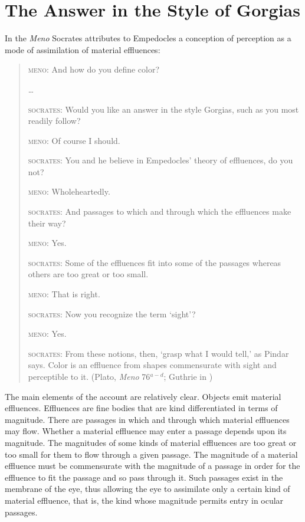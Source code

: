 
\section{The Answer in the Style of Gorgias} %
\label{sec:the_answer_in_the_style_of_gorgias}

In the \emph{Meno} Socrates attributes to Empedocles a conception of perception as a mode of assimilation of material effluences:
\begin{quotation}
    \textsc{meno}: And how do you define color?
    
    \ldots
    
    \textsc{socrates}: Would you like an answer in the style Gorgias, such as you most readily follow?
    
    \textsc{meno}: Of course I should.
    
    \textsc{socrates}: You and he believe in Empedocles' theory of effluences, do you not?
    
    \textsc{meno}: Wholeheartedly.
    
    \textsc{socrates}: And passages to which and through which the effluences make their way?
    
    \textsc{meno}: Yes.
    
    \textsc{socrates}: Some of the effluences fit into some of the passages whereas others are too great or too small.
    
    \textsc{meno}: That is right.
    
    \textsc{socrates}: Now you recognize the term `sight'?
    
    \textsc{meno}: Yes.
    
    \textsc{socrates}: From these notions, then, `grasp what I would tell,' as Pindar says. Color is an effluence from shapes commensurate with sight and perceptible to it. (Plato, \emph{Meno} 76\( ^{a-d} \); Guthrie in \citealt[359]{Hamilton:1989fk})
\end{quotation}

The main elements of the account are relatively clear. Objects emit material effluences. Effluences are fine bodies that are kind differentiated in terms of magnitude. There are passages in which and through which material effluences may flow. Whether a material effluence may enter a passage depends upon its magnitude. The magnitudes of some kinds of material effluences are too great or too small for them to flow through a given passage. The magnitude of a material effluence must be commensurate with the magnitude of a passage in order for the effluence to fit the passage and so pass through it. Such passages exist in the membrane of the eye, thus allowing the eye to assimilate only a certain kind of material effluence, that is, the kind whose magnitude permits entry in ocular passages.

